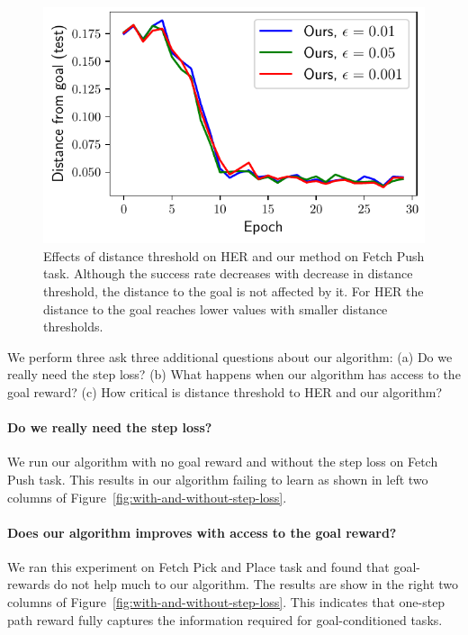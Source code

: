 \begin{figure}
  \includegraphics[width=\frac\columnwidth]{media/res/ablate-ddpg-dqst-low_tresh_chosen-low_thresh_alt-dqst/0.001-FetchPushPR-be467dfepoch-test/ag_g_dist.pdf}%
  \caption{Effects of distance threshold on HER and our method on Fetch Push
task. Although the success rate decreases with decrease in distance threshold,
the distance to the goal is not affected by it. For HER the distance to the goal
reaches lower values with smaller distance thresholds.}%
  \label{fig:with-different-distance-thresholds}%
\end{figure}%
% 

We perform three ask three additional questions about our algorithm:
(a) Do we really need the step loss?
(b) What happens when our algorithm has access to the goal reward?
(c) How critical is distance threshold to HER and our algorithm?
\paragraph{Do we really need the step loss?}
%
We run our algorithm with no goal reward and without the step loss on Fetch Push
task. This results in our algorithm failing to learn as shown in left two
columns of Figure~\ref{fig:with-and-without-step-loss}.

\paragraph{Does our algorithm improves with access to the goal reward?}

We ran this experiment on Fetch Pick and Place task and found that goal-rewards
do not help much to our algorithm. The results are show in the right two columns
of Figure~\ref{fig:with-and-without-step-loss}. This indicates that one-step path reward
fully captures the information required for goal-conditioned tasks.

